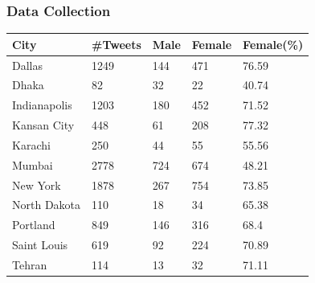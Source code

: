 \documentclass{beamer}
\begin{document}
    \begin{frame}
        \frametitle{Data Collection}
        \centering
        \begin{tabular}{|l|l|l|l|l|}
            \hline
            \rowcolor{LightCyan}
            \textbf{City} & \textbf{\#Tweets} & \textbf{Male} & \textbf{Female} & \textbf{Female(\%)}   \\
           
            \hline
            Dallas & 1249 & 144 & 471 & 76.59 \\
            \hline
            Dhaka & 82 & 32 &  22 & 40.74  \\
            \hline
            Indianapolis & 1203 & 180 & 452 & 71.52  \\
            \hline
            Kansan City & 448 & 61 & 208 & 77.32  \\
            \hline
            Karachi & 250 & 44 & 55 & 55.56  \\
            \hline
            Mumbai & 2778 & 724 & 674 & 48.21  \\
            \hline
            New York & 1878 & 267 & 754 & 73.85  \\
            \hline
            North Dakota & 110 & 18 & 34 & 65.38  \\
            \hline
            Portland & 849 & 146 & 316 & 68.4  \\
            \hline
            Saint Louis & 619 & 92 & 224 & 70.89  \\
            \hline
            Tehran & 114 & 13 & 32 & 71.11  \\
            \hline
           
           
        \end{tabular}
       
    \end{frame}
\end{document}
